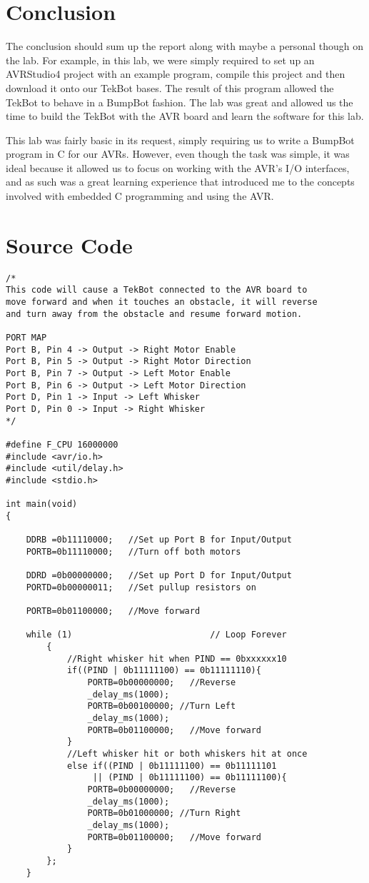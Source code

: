 \documentclass[12pt,letterpaper]{article}
\begin{document}
\section{Conclusion}

The conclusion should sum up the report along with maybe a personal though on
the lab.  For example, in this lab, we were simply required to set up an
AVRStudio4 project with an example program, compile this project and then
download it onto our TekBot bases.  The result of this program allowed the
TekBot to behave in a BumpBot fashion.  The lab was great and allowed us the
time to build the TekBot with the AVR board and learn the software for this
lab.

This lab was fairly basic in its request, simply requiring us to write a
BumpBot program in C for our AVRs.  However, even though the task was simple,
it was ideal because it allowed us to focus on working with the AVR's I/O
interfaces, and as such was a great learning experience that introduced me to
the concepts involved with embedded C programming and using the AVR.

\section{Source Code}

\begin{verbatim}
/*
This code will cause a TekBot connected to the AVR board to
move forward and when it touches an obstacle, it will reverse
and turn away from the obstacle and resume forward motion.

PORT MAP
Port B, Pin 4 -> Output -> Right Motor Enable
Port B, Pin 5 -> Output -> Right Motor Direction
Port B, Pin 7 -> Output -> Left Motor Enable
Port B, Pin 6 -> Output -> Left Motor Direction
Port D, Pin 1 -> Input -> Left Whisker
Port D, Pin 0 -> Input -> Right Whisker
*/

#define F_CPU 16000000
#include <avr/io.h>
#include <util/delay.h>
#include <stdio.h>

int main(void)
{

    DDRB =0b11110000;   //Set up Port B for Input/Output
    PORTB=0b11110000;   //Turn off both motors

    DDRD =0b00000000;   //Set up Port D for Input/Output
    PORTD=0b00000011;   //Set pullup resistors on

    PORTB=0b01100000;   //Move forward
    
    while (1)                           // Loop Forever
        {
            //Right whisker hit when PIND == 0bxxxxxx10
            if((PIND | 0b11111100) == 0b11111110){
                PORTB=0b00000000;   //Reverse
                _delay_ms(1000);
                PORTB=0b00100000; //Turn Left
                _delay_ms(1000);
                PORTB=0b01100000;   //Move forward
            }
            //Left whisker hit or both whiskers hit at once
            else if((PIND | 0b11111100) == 0b11111101
                 || (PIND | 0b11111100) == 0b11111100){
                PORTB=0b00000000;   //Reverse
                _delay_ms(1000);
                PORTB=0b01000000; //Turn Right
                _delay_ms(1000);
                PORTB=0b01100000;   //Move forward
            }
        };
    }
\end{verbatim}
\end{document}
